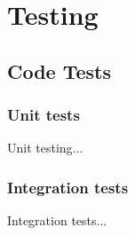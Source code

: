 \section{Testing}
\label{sec:testing}

\subsection{Code Tests}
\label{subsec:code_tests}

\subsubsection{Unit tests}
\label{subsubsec:unit_tests}

Unit testing...

\subsubsection{Integration tests}
\label{subsubsec:integration_tests}

Integration tests...